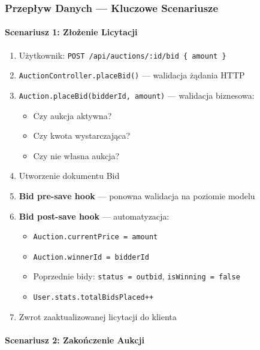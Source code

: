 \subsubsection{Przepływ Danych --- Kluczowe Scenariusze}

\paragraph{Scenariusz 1: Złożenie Licytacji}

\begin{enumerate}
  \item Użytkownik: \texttt{POST /api/auctions/:id/bid \{ amount \}}
  \item \texttt{AuctionController.placeBid()} --- walidacja żądania HTTP
  \item \texttt{Auction.placeBid(bidderId, amount)} --- walidacja biznesowa:
        \begin{itemize}
          \item Czy aukcja aktywna?
          \item Czy kwota wystarczająca?
          \item Czy nie własna aukcja?
        \end{itemize}
  \item Utworzenie dokumentu Bid
  \item \textbf{Bid pre-save hook} --- ponowna walidacja na poziomie modelu
  \item \textbf{Bid post-save hook} --- automatyzacja:
        \begin{itemize}
          \item \texttt{Auction.currentPrice = amount}
          \item \texttt{Auction.winnerId = bidderId}
          \item Poprzednie bidy: \texttt{status = outbid}, \texttt{isWinning = false}
          \item \texttt{User.stats.totalBidsPlaced++}
        \end{itemize}
  \item Zwrot zaaktualizowanej licytacji do klienta
\end{enumerate}

\paragraph{Scenariusz 2: Zakończenie Aukcji}

